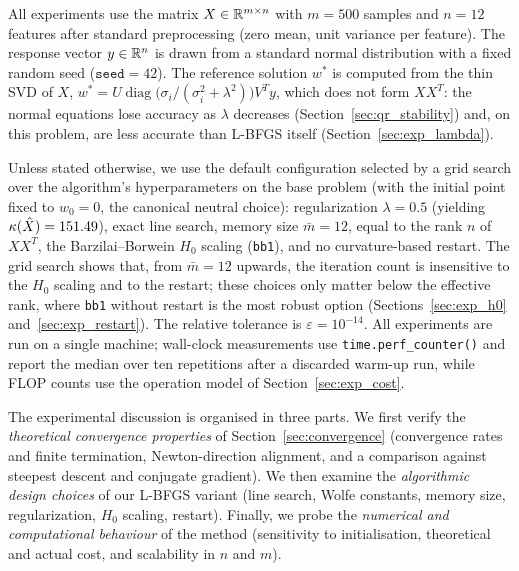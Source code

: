 \label{sec:experiments}

\noindent All experiments use the matrix $X \in \mathbb{R}^{m \times n}$ with $m = 500$
samples and $n = 12$ features after standard preprocessing (zero mean, unit
variance per feature). The response vector $y \in \mathbb{R}^n$ is drawn from a
standard normal distribution with a fixed random seed ($\texttt{seed} = 42$).
The reference solution $w^*$ is computed from the thin SVD of $X$,
$w^* = U\operatorname{diag}\bigl(\sigma_i/(\sigma_i^2+\lambda^2)\bigr)V^Ty$,
which does not form $XX^T$: the normal equations lose accuracy as $\lambda$
decreases (Section~\ref{sec:qr_stability}) and, on this problem, are less
accurate than L-BFGS itself (Section~\ref{sec:exp_lambda}).

\noindent Unless stated otherwise, we use the default configuration selected by
a grid search over the algorithm's hyperparameters on the base problem
(with the initial point fixed to $w_0 = 0$, the canonical neutral choice):
regularization $\lambda = 0.5$ (yielding $\kappa(\hat{X}) = 151.49$), exact line
search, memory size $\bar{m} = 12$, equal to the rank $n$ of $XX^T$, the
Barzilai--Borwein $H_0$ scaling (\texttt{bb1}), and no curvature-based
restart. The grid search shows that, from $\bar m = 12$ upwards, the iteration
count is insensitive to the $H_0$ scaling and to the restart; these choices
only matter below the effective rank, where \texttt{bb1} without restart is
the most robust option (Sections~\ref{sec:exp_h0} and~\ref{sec:exp_restart}).
The relative tolerance is $\varepsilon = 10^{-14}$. All experiments are run on
a single machine; wall-clock measurements use \texttt{time.perf\_counter()}
and report the median over ten repetitions after a discarded warm-up run,
while FLOP counts use the operation model of Section~\ref{sec:exp_cost}.

\noindent The experimental discussion is organised in three parts. We first verify
the \emph{theoretical convergence properties} of
Section~\ref{sec:convergence} (convergence rates and finite termination,
Newton-direction alignment, and a comparison against steepest descent and
conjugate gradient). We then examine the \emph{algorithmic design choices}
of our L-BFGS variant (line search, Wolfe constants, memory size,
regularization, $H_0$ scaling, restart). Finally, we probe the
\emph{numerical and computational behaviour} of the method (sensitivity to
initialisation, theoretical and actual cost, and scalability in $n$ and $m$).


